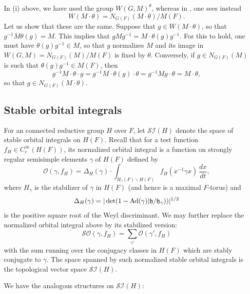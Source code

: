 \documentclass[11pt]{amsart}
\theoremstyle{plain}
\numberwithin{equation}{section}
\begin{document}
\vskip 5pt

 In (i) above, we have used the group $W(G,M)^{\theta}$, whereas in \cite[I.3.1 and I.4.2]{MW1}, one sees instead
\[  W(M \cdot \theta) = N_{G(F)}(M \cdot \theta) / M(F). \]
Let us show that these are the same. Suppose that $g \in W(M \cdot \theta)$, so that $g^{-1} M \theta(g) = M$.  This implies that $gMg^{-1} = M \cdot \theta(g)g^{-1}$. 
For this to hold, one must have $\theta(g) g^{-1} \in M$, so that $g$ normalizes $M$ and its image in $W(G,M) = N_{G(F)}(M)/M(F)$ is fixed by $\theta$. 
Conversely, if $g \in N_{G(F)}(M)$ is such that $\theta(g) g^{-1} \in M(F)$, then
\[  g^{-1} M \cdot \theta \cdot g = g^{-1} M \cdot \theta(g) \cdot \theta = g^{-1}M g \cdot\theta = M \cdot \theta, \]
so that $g \in N_{G(F)}(M \cdot\theta)$. 
\vskip 5pt

\subsection{\bf Stable orbital integrals}
For  an connected reductive group $H$ over $F$, let $\mathcal{SI}(H)$ denote the space of stable orbital integrals on $H(F)$.
Recall that  for a test function $f_H \in C^{\infty}_c(H(F))$, its normalized orbital integral is a function on strongly regular semisimple elements $\gamma$ of $H(F)$
defined by
\begin{equation} \label{E:orb-int2}
 \mathcal{O}(\gamma, f_H) = \Delta_H(\gamma) \cdot  \int_{H_{\gamma}(F) \backslash H(F)} f_H( x^{-1} \gamma  x) \, \frac{dx}{dt}, \end{equation}
where $H_{\gamma}$ is the stabilizer of $\gamma$ in $H(F)$ (and hence is a maximal $F$-torus) and 
\[ \Delta_H(\gamma) =  |\det (1- {\rm Ad}(\gamma) |  \mathfrak{h} / \mathfrak{h}_{\gamma}))|^{1/2} \]
is the positive square root of the Weyl discriminant.  We may further replace the normalized orbital integral above by its stabilized version:
\begin{equation} \label{E:orb-int3}
 \mathcal{SO}(\gamma, f_H) = \sum_{\gamma'}   \mathcal{O}(\gamma', f_H) \end{equation}
with the sum running over the conjugacy classes in $H(F)$ which are stably conjugate to $\gamma$.  
The space spanned by  such normalized stable orbital integrals is the  topological vector space $\mathcal{SI}(H)$.
\vskip 5pt



We have the analogous structures on $\mathcal{SI}(H)$:
\vskip 5pt
\end{document}

